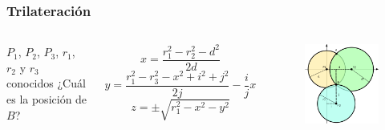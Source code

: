 \documentclass[mathserif]{beamer}
\begin{document}

\begin{frame}
\frametitle{Trilateración}

\begin{columns}[t] %


$P_1$, $P_2$, $P_3$, $r_1$, $r_2$ y $r_3$ conocidos
¿Cuál es la posición de $B$?

\vspace*{.1\textwidth}

\begin{equation*}
x=\frac{r_1^2-r_2^2-d^2}{2d}
\end{equation*}
\begin{equation*}
y=\frac{r_1^2-r_3^2-x^2+i^2+j^2}{2j}-\frac{i}{j}x
\end{equation*}
\begin{equation*}
z=\pm\sqrt{r_1^2-x^2-y^2}
\end{equation*}

\begin{figure}
\includegraphics[width=\textwidth]{../figures_chesta/estado_del_arte/trilateration}
\end{figure}

\end{columns}

\end{frame}
\end{document}
